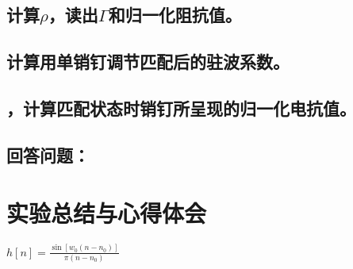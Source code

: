 \documentclass{../source/Experiment}
\begin{document}
        \subsection{计算$\rho $，读出$\Gamma $和归一化阻抗值。}
        \subsection{计算用单销钉调节匹配后的驻波系数。}
        \subsection{，计算匹配状态时销钉所呈现的归一化电抗值。}

        \subsection{回答问题：}
            \subsubsection{}
            \subsubsection{}
            \subsubsection{}
            \subsubsection{}
            \subsubsection{}

    \section{实验总结与心得体会}
    $h[n]=\frac{\sin \left[w_{0}\left(n-n_{0}\right)\right]}{\pi\left(n-n_{0}\right)}$
\end{document}
